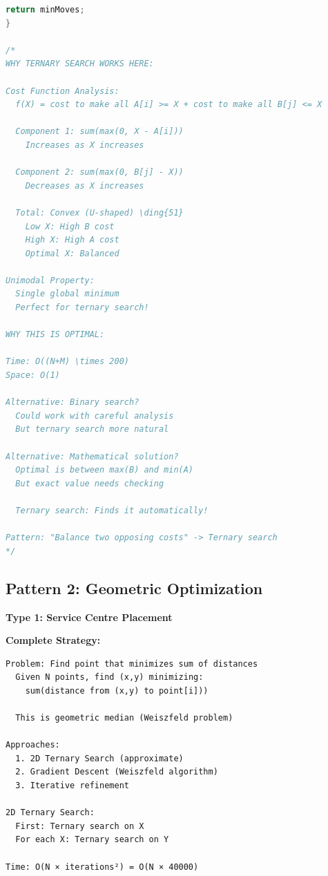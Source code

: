 \documentclass[11pt,a4paper,oneside]{book}
\begin{document}
\begin{lstlisting}[language=C++, caption=Complete Basic Optimization Solutions - NEW PROBLEMS]
    return minMoves;
}

/*
WHY TERNARY SEARCH WORKS HERE:

Cost Function Analysis:
  f(X) = cost to make all A[i] >= X + cost to make all B[j] <= X
  
  Component 1: sum(max(0, X - A[i]))
    Increases as X increases
  
  Component 2: sum(max(0, B[j] - X))
    Decreases as X increases
  
  Total: Convex (U-shaped) \ding{51}
    Low X: High B cost
    High X: High A cost
    Optimal X: Balanced

Unimodal Property:
  Single global minimum
  Perfect for ternary search!

WHY THIS IS OPTIMAL:

Time: O((N+M) \times 200)
Space: O(1)

Alternative: Binary search?
  Could work with careful analysis
  But ternary search more natural
  
Alternative: Mathematical solution?
  Optimal is between max(B) and min(A)
  But exact value needs checking
  
  Ternary search: Finds it automatically!

Pattern: "Balance two opposing costs" -> Ternary search
*/
\end{lstlisting}

\subsection{Pattern 2: Geometric Optimization}

\begin{tcolorbox}[
    enhanced,breakable,
    colback=lightgray,
    colframe=accentorange,
    boxrule=2pt,
    arc=4mm,
    title=\textbf{Complete Geometric Optimization Algorithms}
]
\textbf{Type 1: Service Centre Placement}

\textbf{Complete Strategy:}
\begin{verbatim}
Problem: Find point that minimizes sum of distances
  Given N points, find (x,y) minimizing:
    sum(distance from (x,y) to point[i]))
  
  This is geometric median (Weiszfeld problem)

Approaches:
  1. 2D Ternary Search (approximate)
  2. Gradient Descent (Weiszfeld algorithm)
  3. Iterative refinement

2D Ternary Search:
  First: Ternary search on X
  For each X: Ternary search on Y
  
Time: O(N × iterations²) = O(N × 40000)
\end{verbatim}
\end{tcolorbox}
\end{document}
